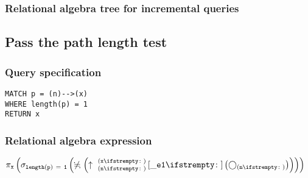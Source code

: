 
\subsubsection*{Relational algebra tree for incremental queries}


\subsection{Pass the path length test}

\subsubsection*{Query specification}

\begin{lstlisting}
MATCH p = (n)-->(x)
WHERE length(p) = 1
RETURN x
\end{lstlisting}

\subsubsection*{Relational algebra expression}

$\projection{\var{x}} \left(\selection{\mathtt{length(p)~=~1}} \left(\alldifferent{} \left(\expandout{n}{x}{}{\_e1}{} \left(\getvertices{n}{}\right)\right)\right)\right)$

